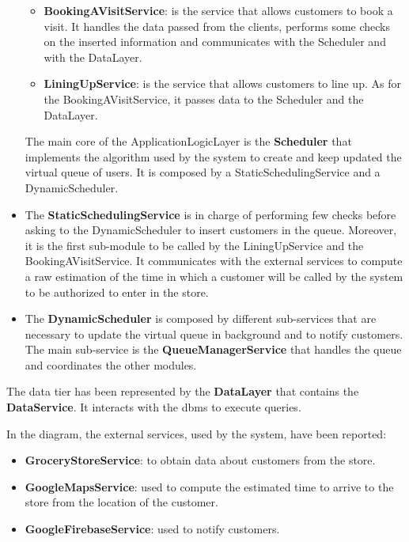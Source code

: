 \begin{itemize}
\begin{itemize}
        \item \textbf{BookingAVisitService}: is the service that allows customers to book a visit. It handles the data passed from the clients, performs some checks on the inserted information and communicates with the Scheduler and with the DataLayer.
        \item \textbf{LiningUpService}: is the service that allows customers to line up. As for the BookingAVisitService, it passes data to the Scheduler and the DataLayer.
    \end{itemize}

    The main core of the ApplicationLogicLayer is the \textbf{Scheduler} that implements the algorithm used by the system to create and keep updated the virtual queue of users. It is composed by a StaticSchedulingService and a DynamicScheduler.
    \item The \textbf{StaticSchedulingService} is in charge of performing few checks before asking to the DynamicScheduler to insert customers in the queue. Moreover, it is the first sub-module to be called by the LiningUpService and the BookingAVisitService. It communicates with the external services to compute a raw estimation of the time in which a customer will be called by the system to be authorized to enter in the store.
    \item The \textbf{DynamicScheduler} is composed by different sub-services that are necessary to update the virtual queue in background and to notify customers.
    The main sub-service is the \textbf{QueueManagerService} that handles the queue and coordinates the other modules.
\end{itemize}

The data tier has been represented by the \textbf{DataLayer} that contains the \textbf{DataService}. It interacts with the \gls{dbms} to execute queries.

In the diagram, the external services, used by the system, have been reported:
\begin{itemize}
    \item \textbf{GroceryStoreService}: to obtain data about customers from the store.
    \item \textbf{GoogleMapsService}: used to compute the estimated time to arrive to the store from the location of the customer.
    \item \textbf{GoogleFirebaseService}: used to notify customers.
\end{itemize}


